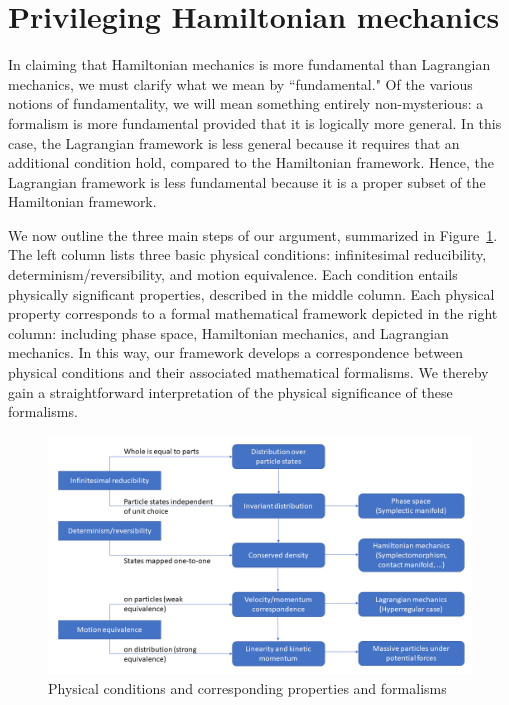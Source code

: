 \documentclass[letterpaper]{article}
\begin{document}

\section{Privileging Hamiltonian mechanics}
\label{privileging}


In claiming that Hamiltonian mechanics is more fundamental than Lagrangian mechanics, we must clarify what we mean by ``fundamental." Of the various notions of fundamentality, we will mean something entirely non-mysterious: a formalism is more fundamental provided that it is logically more general. In this case, the Lagrangian framework is less general because it requires that an additional condition hold, compared to the Hamiltonian framework. Hence, the Lagrangian framework is less fundamental because it is a proper subset of the Hamiltonian framework. 

We now outline the three main steps of our argument, summarized in Figure~\ref{diagram}. The left column lists three basic physical conditions: infinitesimal reducibility, determinism/reversibility, and motion equivalence. Each condition entails physically significant properties, described in the middle column. Each physical property corresponds to a formal mathematical framework depicted in the right column: including phase space, Hamiltonian mechanics, and Lagrangian mechanics. In this way, our framework develops a correspondence between physical conditions and their associated mathematical formalisms. We thereby gain a straightforward interpretation of the physical significance of these formalisms.

\begin{figure}[h]
	\centering
	\includegraphics[width=\textwidth]{Diagram.png}
\caption{Physical conditions and corresponding properties and formalisms}
\label{diagram}
\end{figure}
\end{document}
